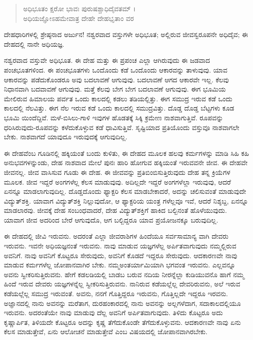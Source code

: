 \begin{verse}
ಅಧಿಭೂತಂ ಕ್ಷರೋ ಭಾವಃ ಪುರುಷಶ್ಚಾಧಿದೈವತಮ್ ।\\ಅಧಿಯಜ್ಞೋಽಹಮೇವಾತ್ರ ದೇಹೇ ದೇಹಭೃತಾಂ ವರ 
\end{verse}

{\small ದೇಹಧಾರಿಗಳಲ್ಲಿ ಶ್ರೇಷ್ಠನಾದ ಅರ್ಜುನ! ನಶ್ವರವಾದ ವಸ್ತುಗಳೇ ಅಧಿಭೂತ; ಅಲ್ಲಿರುವ ಜೀವಸ್ವರೂಪನೇ ಅಧಿದೈವ; ಈ ದೇಹದಲ್ಲಿ ನಾನೇ ಅಧಿಯಜ್ಞ.}

ನಶ್ವರವಾದ ವಸ್ತುವೇ ಅಧಿಭೂತ. ಈ ದೇಹ ಮತ್ತು ಈ ಪ್ರಪಂಚ ಎಲ್ಲಾ ಆಗಿರುವುದು ಈ ಜಡವಾದ ಪಂಚಭೂತಗಳಿಂದ. ಈ ಪಂಚಭೂತಗಳು ಒಂದೊಂದು ಕಡೆ ಒಂದೊಂದು ಆಕಾರವನ್ನು ತಾಳುವುವು. ಯಾವ ಆಕಾರವನ್ನು ಪಡೆದುಕೊಂಡರೂ ಅವು ಬದಲಾವಣೆ ಆಗುವುವು. ಬದಲಾವಣೆ ಆಗದ ಆಕಾರವೇ ಇಲ್ಲ. ಕೆಲವು ನಿಧಾನವಾಗಿ ಬದವಾವಣೆ ಆಗುವುವು. ಮತ್ತೆ ಕೆಲವು ಬೇಗ ಬೇಗ ಬದಲಾವಣೆ ಆಗುವುವು. ಈಗ ಭೂಮಿಯ ಮೇಲಿರುವ ಹಿಮಾಲಯ ಪರ್ವತ ಒಂದು ಕಾಲದಲ್ಲಿ ಕಡಲು ತಡಿಯಲ್ಲಿತ್ತು. ಈಗ ಸಮುದ್ರ ಇರುವ ಕಡೆ ಒಂದು ಕಾಲದಲ್ಲಿ ನೆಲವಿತ್ತು. ಈಗ ನೆಲ ಇರುವ ಕಡೆ ಒಂದು ಕಾಲದಲ್ಲಿ ಸಮುದ್ರವಿತ್ತು. ದೊಡ್ಡ ದೊಡ್ಡ ಬೆಟ್ಟಗಳು ಕೂಡ ಭೂಮಿ ಯಿಂದೆದ್ದಿವೆ. ಮಳೆ-ಬಿಸಿಲು-ಗಾಳಿ ಇವುಗಳ ಹೊಡತಕ್ಕೆ ಸಿಕ್ಕಿ ಕ್ರಮೇಣ ನಾಶವಾಗುತ್ತಿವೆ. ರೂಪವನ್ನು ಧರಿಸಿರುವುದು-ರೂಪವನ್ನು ಕಳೆದುಕೊಳ್ಳುವ ಕಡೆ ಧಾವಿಸುತ್ತಿವೆ. ಸೃಷ್ಟಿಯಾದ ಪ್ರತಿಯೊಂದು ವಸ್ತುವೂ ನಾಶವಾಗಲೇ ಬೇಕು. ನಾಶವಾಗದೆ ಯಾವುದೂ ಇರುವುದಕ್ಕೆ ಆಗುವುದಿಲ್ಲ. 

ಈ ದೇಹವೆಂಬ ಗೂಡಿನಲ್ಲಿ ಹಕ್ಕಿಯಂತೆ ಬಂದು ಕುಳಿತು, ಈ ದೇಹದ ಮೂಲಕ ಹಲವು ಕರ್ಮಗಳನ್ನು ಮಾಡಿ ಸಿಹಿ ಕಹಿ ಅನುಭವಗಳನ್ನುಂಡು, ದೇಹ ನಾಶವಾದ ಮೇಲೆ ಪುನಃ ಹಾರಿ ಹೋಗುವ ಹಕ್ಕಿಯಂತೆ ಇರುವವನೇ ಜೀವ. ಈ ದೇಹವೇ ಜೀವನಲ್ಲ. ಜೀವ ವಾಸಿಸುವ ಗೂಡು ಈ ದೇಹ. ಈ ಜೀವವನ್ನು ಪ್ರತಿಬಿಂಬಿಸುತ್ತಿರುವುದು ದೇಹ ತನ್ನ ಕ್ರಿಯೆಗಳ ಮೂಲಕ. ಜೀವ ಇದ್ದರೆ ಅಂಗಗಳೆಲ್ಲ ಕೆಲಸ ಮಾಡುವುವು. ಅದಿಲ್ಲದೇ ಇದ್ದರೆ ಅಂಗಗಳೆಲ್ಲಾ ಇರುವುವು, ಆದರೆ ಏನನ್ನೂ ಮಾಡಲಾಗುವುದಿಲ್ಲ. ದೊಡ್ಡದೊಂದು ಫ್ಯಾಕ್ಟರಿ ಕೆಲಸ ಮಾಡಬೇಕಾದರೆ, ಅದನ್ನು ಚಲಿಸುವಂತೆ ಮಾಡುವುದೇ ವಿದ್ಯುತ್​ಶಕ್ತಿ. ಯಾವಾಗ ವಿದ್ಯುತ್​ಶಕ್ತಿ ನಿಲ್ಲುವುದೋ, ಆ ಫ್ಯಾಕ್ಟರಿಯ ಯಂತ್ರ ಗಳೆಲ್ಲವೂ ಇವೆ, ಆದರೆ ನಿಶ್ಶಬ್ದ, ಏನನ್ನೂ ಮಾಡಲಾರವು. ಜೀವಕ್ಕೆ ದೇಹ ಸಂಬಂಧವಾದರೆ, ದೇಹ ವಿದ್ಯುತ್​ಶಕ್ತಿಗೆ ಹಾಕಿದ ಬಲ್ಬಿನಂತೆ ಹೊಳೆಯುವುದು. ಯಾವಾಗ ಜೀವ ಅದರಿಂದ ಬೇರೆ ಆಗುವುದೊ, ಆಗ ಬಲ್ಬಿದ್ದರೂ ಯಾವ ಪ್ರಯೋಜನಕ್ಕೂ ಬರುವುದಿಲ್ಲ.

ಈ ದೇಹದಲ್ಲಿ ಜೀವಿ ಇರುವನು. ಅದರಂತೆ ಎಲ್ಲಾ ಜೀವರಾಶಿಗಳ ಹಿಂದೆಯೂ ಸರ್ವಸಾಮಾನ್ಯ ವಾಗಿ ದೇವರು ಇರುವನು. ಇವನೇ ಅಧಿಯಜ್ಞನಂತೆ ಇರುವನು. ನಾವು ಮಾಡುವ ಯಜ್ಞಗಳೆಲ್ಲ ಅರ್ಪಿತವಾಗುವುದು ನಮ್ಮಲ್ಲಿರುವ ಅವನಿಗೆ. ನಾವು ಅವನಿಗೆ ಕೊಟ್ಟರೂ ಸೇರುವುದು, ಅವನಿಗೆ ಕೊಡದೆ ಇದ್ದರೂ ಸೇರುವುದು. ಆದಕಾರಣವೇ ನಾವು ಮಾಡುವ ಕರ್ಮಗಳೆಲ್ಲ ಜೋಪಾನವಾಗಿರ ಬೇಕು. ನಮ್ಮಅಂತರ್ಯಾಮಿಯಾಗಿ ಭಗವಂತ ಇರುವನು. ಎಲ್ಲವನ್ನೂ ಅವನು ಸ್ವೀಕರಿಸುತ್ತಿರುವನು. ಹೇಗೆ ಕಡಲಡಿಯಲ್ಲಿ ಬಾಡಬ ಬರುವ ನದಿಯ ನೀರನ್ನೆಲ್ಲಾ ಕುಡಿಯುವನೊ ಹಾಗೆ ನಮ್ಮ ಹಿಂದೆ ಇರುವ ದೇವರು ಯಜ್ಞಗಳನ್ನೆಲ್ಲ ಸ್ವೀಕರಿಸುತ್ತಿರುವನು. ನಾನಿರುವ ಕಡೆಯಲ್ಲೆಲ್ಲ ದೇವರಿರುವನು, ಅಲೆ ಇರುವ ಕಡೆಯಲ್ಲೆಲ್ಲ ಸಮುದ್ರ ಇರುವಂತೆ. ಅವನು, ನನಗೆ ಗೊತ್ತಿದ್ದರೂ ಇರುವನು, ಗೊತ್ತಿಲ್ಲದೇ ಇದ್ದರೂ ಇರವನು. ಅಜ್ಞಾನದಲ್ಲಿ ನಾನು ಅವನನ್ನು ಮರೆತಾಗ, ದುರಹಂಕಾರದಲ್ಲಿ ನಾನು ಅವನನ್ನು ಅಲ್ಲಗಳೆದಾಗ, ಸದಾಕಾಲದಲ್ಲಿಯೂ ಇರುವನು. ಅದರಂತೆಯೇ ನಾವು ಮಾಡುವು ದೆಲ್ಲ ಅವನಿಗೆ ಅರ್ಪಿತವಾಗುವುದು. ತಿಳಿದು ಕೊಟ್ಟರೂ ಅದು ಕೃಷ್ಣಾರ್ಪಿತ, ತಿಳಿಯದೇ ಕೊಟ್ಟರೂ ಅದನ್ನು ಕೃಷ್ಣ ತೆಗೆದುಕೊಂಡೇ ತೆಗೆದುಕೊಳ್ಳುವನು. ಆದಕಾರಣವೇ ನಾವು ಏನು ಕೆಲಸ ಮಾಡುತ್ತೇವೆ, ಏನು ಆಲೋಚನೆ ಮಾಡುತ್ತೇವೆ ಎಂಬ ವಿಷಯದಲ್ಲಿ ಜೋಪಾನವಾಗಿರಬೇಕು.

